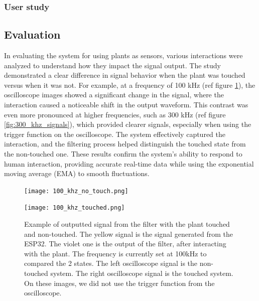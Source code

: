 \newpage
\subsubsection{User study}

\subsection{Evaluation}

In evaluating the system for using plants as sensors, various interactions were analyzed to understand how they impact the signal output. The study demonstrated a clear difference in signal behavior when the plant was touched versus when it was not. For example, at a frequency of 100 kHz (ref figure \ref{fig:100_khz_signals}), the oscilloscope images showed a significant change in the signal, where the interaction caused a noticeable shift in the output waveform. This contrast was even more pronounced at higher frequencies, such as 300 kHz (ref figure \ref{fig:300_khz_signals}), which provided clearer signals, especially when using the trigger function on the oscilloscope. The system effectively captured the interaction, and the filtering process helped distinguish the touched state from the non-touched one. These results confirm the system's ability to respond to human interaction, providing accurate real-time data while using the exponential moving average (EMA) to smooth fluctuations.

\begin{figure}[h!]
    \centering
    \begin{minipage}{.5\textwidth}
      \centering
      \texttt{[image: 100\_khz\_no\_touch.png]}
      \label{fig:100_khz_no_touch}
    \end{minipage}%
    \begin{minipage}{.5\textwidth}
      \centering
      \texttt{[image: 100\_khz\_touched.png]}
      \label{fig:100_khz_touched}
    \end{minipage}
    \caption{Example of outputted signal from the filter with the plant touched and non-touched. The yellow signal is the signal generated from the ESP32. The violet one is the output of the filter, after interacting with the plant. The frequency is currently set at 100kHz to compared the 2 states. The left oscilloscope signal is the non-touched system. The right oscilloscope signal is the touched system. On these images, we did not use the trigger function from the oscilloscope.}
    \label{fig:100_khz_signals}
\end{figure}


